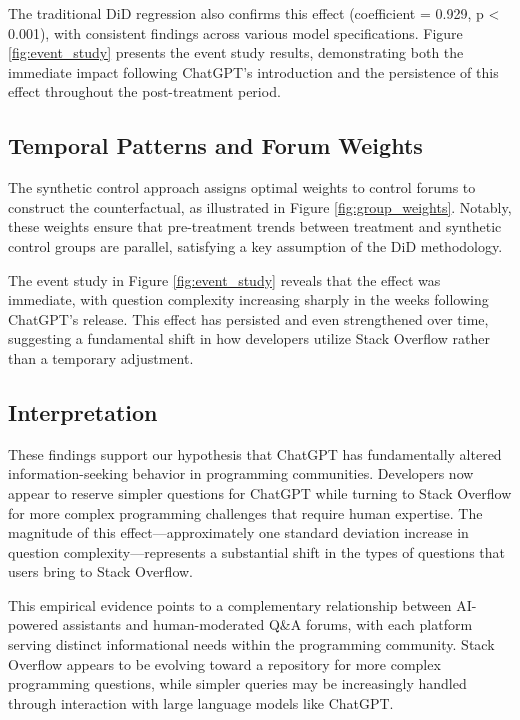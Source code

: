 The traditional DiD regression also confirms this effect (coefficient = 0.929, p < 0.001), with consistent findings across various model specifications. Figure \ref{fig:event_study} presents the event study results, demonstrating both the immediate impact following ChatGPT's introduction and the persistence of this effect throughout the post-treatment period. 

\subsection{Temporal Patterns and Forum Weights}

The synthetic control approach assigns optimal weights to control forums to construct the counterfactual, as illustrated in Figure \ref{fig:group_weights}. Notably, these weights ensure that pre-treatment trends between treatment and synthetic control groups are parallel, satisfying a key assumption of the DiD methodology.

The event study in Figure \ref{fig:event_study} reveals that the effect was immediate, with question complexity increasing sharply in the weeks following ChatGPT's release. This effect has persisted and even strengthened over time, suggesting a fundamental shift in how developers utilize Stack Overflow rather than a temporary adjustment.

\subsection{Interpretation}

These findings support our hypothesis that ChatGPT has fundamentally altered information-seeking behavior in programming communities. Developers now appear to reserve simpler questions for ChatGPT while turning to Stack Overflow for more complex programming challenges that require human expertise. The magnitude of this effect—approximately one standard deviation increase in question complexity—represents a substantial shift in the types of questions that users bring to Stack Overflow.

This empirical evidence points to a complementary relationship between AI-powered assistants and human-moderated Q&A forums, with each platform serving distinct informational needs within the programming community. Stack Overflow appears to be evolving toward a repository for more complex programming questions, while simpler queries may be increasingly handled through interaction with large language models like ChatGPT.